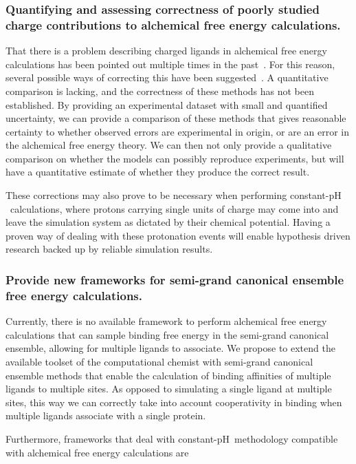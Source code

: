 \documentclass[10pt,final]{article}
\newcommand{\pH}{p$\mathrm{H}$\ }
\begin{document}
\subsubsection*{Quantifying and assessing correctness of poorly studied charge contributions to alchemical free energy calculations.}
That there is a problem describing charged ligands in alchemical free energy calculations has been pointed out multiple times in the past~\cite{Rocklin2013b,Muddana2014a}. 
For this reason, several possible ways of correcting this have been suggested~\cite{Reif2013a,Rocklin2013a}. A quantitative comparison is lacking, and the correctness of these methods has not been established. 
By providing an experimental dataset with small and quantified uncertainty, we can provide a comparison of these methods that gives reasonable certainty to whether observed errors are experimental in origin, or are an error in the alchemical free energy theory. 
We can then not only provide a qualitative comparison on whether the models can possibly reproduce experiments, but will have a quantitative estimate of whether they produce the correct result.

These corrections may also prove to be necessary when performing constant-\pH calculations, where protons carrying single units of charge may come into and leave the simulation system as dictated by their chemical potential. Having a proven way of dealing with these protonation events will enable hypothesis driven research backed up by reliable simulation results.


\subsubsection*{Provide new frameworks for semi-grand canonical ensemble free energy calculations.}
Currently, there is no available framework to perform alchemical free energy calculations that can sample binding free energy in the semi-grand canonical ensemble, allowing for multiple ligands to associate.
We propose to extend the available toolset of the computational chemist with semi-grand canonical ensemble methods that enable the calculation of binding affinities of multiple ligands to multiple sites.
As opposed to simulating a single ligand at multiple sites, this way we can correctly take into account cooperativity in binding when multiple ligands associate with a single protein.

Furthermore, frameworks that deal with constant-\pH methodology compatible with alchemical free energy calculations are 
\end{document}
